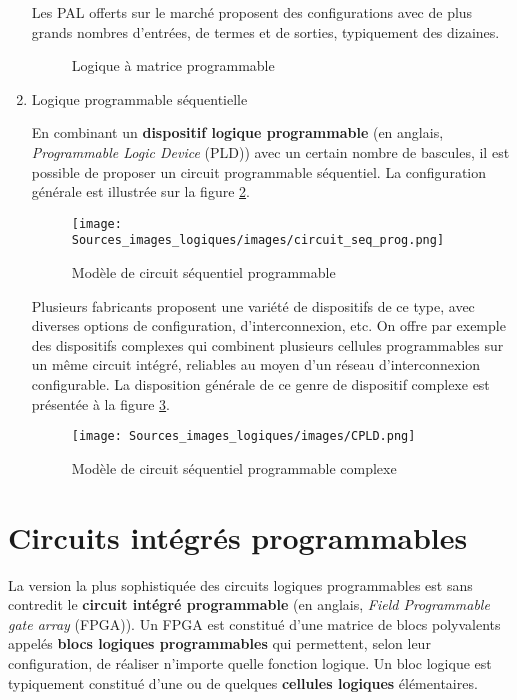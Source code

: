 \documentclass[letter, oneside]{book}
\begin{document}
\begin{enumerate}
Les PAL offerts sur le marché proposent des configurations avec de
plus grands nombres d'entrées, de termes et de sorties, typiquement
des dizaines.


\begin{figure}[htbp]
\centering

\caption{\label{fig:org1c2f696}Logique à matrice programmable}
\end{figure}

\item Logique programmable séquentielle
\label{sec:org224e90b}

En combinant un \textbf{dispositif logique programmable} (en anglais,
\emph{Programmable Logic Device} (PLD)) avec un certain nombre de
bascules, il est possible de proposer un circuit programmable
séquentiel. La configuration générale est illustrée sur la
figure \ref{fig:org98cba68}.


\begin{figure}[htbp]
\centering
\texttt{[image: Sources\_images\_logiques/images/circuit\_seq\_prog.png]}
\caption{\label{fig:org98cba68}Modèle de circuit séquentiel programmable}
\end{figure} 

Plusieurs fabricants proposent une variété de dispositifs de ce type,
avec diverses options de configuration, d'interconnexion, etc.  On
offre par exemple des dispositifs complexes qui combinent plusieurs
cellules programmables sur un même circuit intégré, reliables au moyen
d'un réseau d'interconnexion configurable. La disposition générale de
ce genre de dispositif complexe est présentée à la figure \ref{fig:org311d3b7}.

\begin{figure}[htbp]
\centering
\texttt{[image: Sources\_images\_logiques/images/CPLD.png]}
\caption{\label{fig:org311d3b7}Modèle de circuit séquentiel programmable complexe}
\end{figure}
\end{enumerate}

\section{Circuits intégrés programmables}
\label{sec:orgfec1afb}

La version la plus sophistiquée des circuits logiques programmables
est sans contredit le \textbf{circuit intégré programmable} (en anglais, \emph{Field
Programmable gate array} (FPGA)). Un FPGA est constitué d'une matrice
de blocs polyvalents appelés \textbf{blocs logiques programmables} qui
permettent, selon leur configuration, de réaliser n'importe quelle
fonction logique. Un bloc logique est typiquement constitué d'une ou
de quelques \textbf{cellules logiques} élémentaires.
\end{document}
